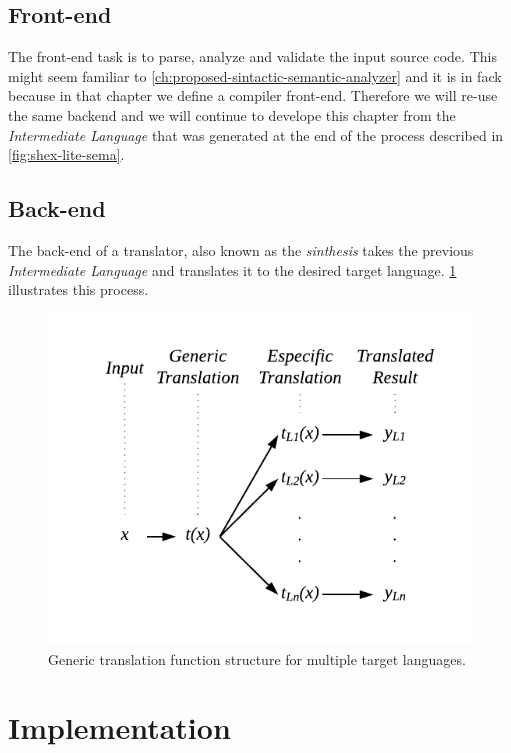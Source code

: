 \subsection{Front-end}
The front-end task is to parse, analyze and validate the input source code. This might seem familiar to
\cref{ch:proposed-sintactic-semantic-analyzer} and it is in fack because in that chapter we define
a compiler front-end. Therefore we will re-use the same backend and we will continue to develope this
chapter from the \textit{Intermediate Language} that was generated at the end of the process described in
\cref{fig:shex-lite-sema}.

\subsection{Back-end}
The back-end of a translator, also known as the \textit{sinthesis} takes the previous \textit{Intermediate Language}
and translates it to the desired target language. \cref{fig:translation-function} illustrates this process.

\begin{figure}
    \includegraphics{images/translation-function.pdf}
    \centering
	\caption[Generic translation function structure]{Generic translation function structure for multiple
	target languages.}
    \label{fig:translation-function}
\end{figure}

\section{Implementation}

